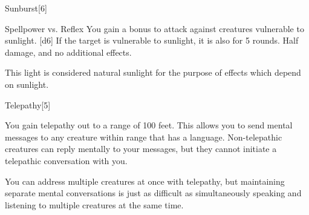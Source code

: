 \begin{spellsection}{Sunburst}[6]
    \begin{spellheader}
    \end{spellheader}
    \begin{spellcontent}
        \begin{spelltargetinginfo}
        \end{spelltargetinginfo}
        \begin{spelleffects}
            \begin{spellattack}{Spellpower vs. Reflex}
                \spellspecial You gain a  bonus to attack against creatures vulnerable to sunlight.
                \spellsuccess {}[d6]
                \spellcritical If the target is vulnerable to sunlight, it is also \blinded for 5 rounds.
                \spellfailure Half damage, and no additional effects.
            \end{spellattack}
        \end{spelleffects}
    \end{spellcontent}
    \begin{spellfooter}
        \spellnotes This light is considered natural sunlight for the purpose of effects which depend on sunlight.
        \miscastyou
    \end{spellfooter}
\end{spellsection}


\begin{spellsection}{Telepathy}[5]
    \begin{spellheader}
    \end{spellheader}
    \begin{spellcontent}
        \begin{spelltargetinginfo}
        \end{spelltargetinginfo}
        \begin{spelleffects}
            \spelleffect You gain telepathy out to a range of 100 feet. This allows you to send mental messages to any creature within range that has a language. Non-telepathic creatures can reply mentally to your messages, but they cannot initiate a telepathic conversation with you.

            You can address multiple creatures at once with telepathy, but maintaining separate mental conversations is just as difficult as simultaneously speaking and listening to multiple creatures at the same time. 
            \spelldur \durlong
        \end{spelleffects}
    \end{spellcontent}
    \begin{spellfooter}
        \miscastexplode
    \end{spellfooter}
\end{spellsection}

